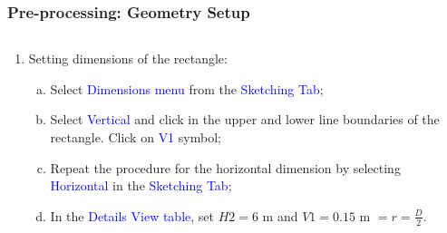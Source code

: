 \documentclass[10pt,compress, unknownkeysallowed]{beamer}
\newcommand{\frc}{\displaystyle\frac}
\newcommand{\blue}{\textcolor{blue}}
\begin{document}
 
\begin{frame}
 \frametitle{Pre-processing: Geometry Setup} 
    \begin{columns}
       \begin{column}[l]{0.5\linewidth}
          \begin{enumerate}\scriptsize\setcounter{enumi}{5}
             \item<1-> Setting dimensions of the rectangle:
                 \begin{enumerate}[a)]\scriptsize
                    \item<1-> Select \blue{Dimensions menu} from the \blue{Sketching Tab};
                    \item<1-> Select \blue{Vertical} and click in the upper and lower line boundaries of the rectangle. Click on \blue{V1} symbol;
                    \item<1-> Repeat the procedure for the horizontal dimension by selecting \blue{Horizontal} in the \blue{Sketching Tab};
                    \item<1-> In the \blue{Details View table}, set $H2 = 6$ m and $V1 = 0.15$ m $= r = \frc{D}{2}$.
                 \end{enumerate}
          \end{enumerate}
       \end{column}
       \begin{column}[l]{0.5\linewidth}
\end{column}
\end{columns}
\end{frame}
\end{document}
